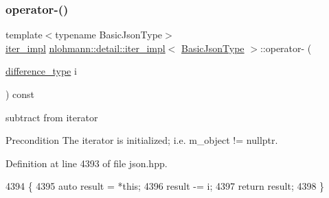 \subsubsection{\texorpdfstring{operator-\/()}{operator-()}\hspace{0.1cm}{\footnotesize\ttfamily [1/2]}}
{\footnotesize\ttfamily template$<$typename Basic\+Json\+Type$>$ \\
\hyperlink{classnlohmann_1_1detail_1_1iter__impl}{iter\+\_\+impl} \hyperlink{classnlohmann_1_1detail_1_1iter__impl}{nlohmann\+::detail\+::iter\+\_\+impl}$<$ \hyperlink{classnlohmann_1_1detail_1_1iter__impl_abf18f18793f84b0222aebb5a2a87da7a}{Basic\+Json\+Type} $>$\+::operator-\/ (\begin{DoxyParamCaption}\item[{\hyperlink{classnlohmann_1_1detail_1_1iter__impl_a2f7ea9f7022850809c60fc3263775840}{difference\+\_\+type}}]{i }\end{DoxyParamCaption}) const\hspace{0.3cm}{\ttfamily [inline]}}



subtract from iterator 

\begin{DoxyPrecond}{Precondition}
The iterator is initialized; i.\+e. {\ttfamily m\+\_\+object != nullptr}. 
\end{DoxyPrecond}


Definition at line 4393 of file json.\+hpp.


\begin{DoxyCode}
4394     \{
4395         \textcolor{keyword}{auto} result = *\textcolor{keyword}{this};
4396         result -= i;
4397         \textcolor{keywordflow}{return} result;
4398     \}
\end{DoxyCode}
\mbox{\label{classnlohmann_1_1detail_1_1iter__impl_a49bf3e708a9c1c88c415011735962d06}} 
